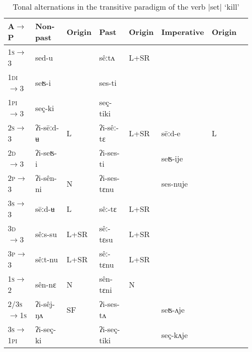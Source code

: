 \documentclass[oldfontcommands,oneside,a4paper,11pt]{article}
\newcommand{\ipa}[1]{{\phon \mbox{#1}}} %
\begin{document}
\begin{table}[H]
\caption{Tonal alternations in the transitive paradigm of the verb |set| `kill' } \label{tab:trans.paradigm2} \centering
\begin{tabular}{llllllll}
\toprule
A$\rightarrow$P& Non-past & Origin & Past & Origin& Imperative& Origin\\
\midrule
\textsc{1s}$\rightarrow$3 & \ipa{sed-u} & & \ipa{sêːtʌ} &L+SR  &  \\
\textsc{1di}$\rightarrow$3 & \ipa{seʦ-i} &  & \ipa{ses-ti}  & \\
\textsc{1pi}$\rightarrow$3 & \ipa{seç-ki} &  & \ipa{seç-tiki} \\
\textsc{2s}$\rightarrow$3 & \ipa{ʔi-sēːd-ʉ} & L  & \ipa{ʔi-sêː-tɛ} &L+SR  &\ipa{sēːd-e} & L\\
\textsc{2d}$\rightarrow$3 & \ipa{ʔi-seʦ-i} & &  \ipa{ʔi-ses-ti} & & \ipa{seʦ-ije} & \\
\textsc{2p}$\rightarrow$3 & \ipa{ʔi-sên-ni} & N & \ipa{ʔi-ses-tɛnu} & &\ipa{ses-nuje} &\\
\textsc{3s}$\rightarrow$3 & \ipa{sēːd-ʉ} & L &\ipa{sêː-tɛ} & L+SR\\
\textsc{3d}$\rightarrow$3 & \ipa{sêːs-su} &L+SR& \ipa{sêː-tɛsu}   & L+SR\\
\textsc{3p}$\rightarrow$3 & \ipa{sêːt-nu} & L+SR& \ipa{sêː-tɛnu} & L+SR\\
\midrule
\textsc{1s}$\rightarrow$2 & \ipa{sên-nɛ} &N& \ipa{sên-tɛni} &N\\
\textsc{2/3s$\rightarrow$1s} & \ipa{ʔi-sêj-ŋʌ} &SF &\ipa{ʔi-ses-tʌ} & &\ipa{seʦ-ʌje}\\
\textsc{3s$\rightarrow$1pi} & \ipa{ʔi-seç-ki} & &\ipa{ʔi-seç-tiki} & &\ipa{seç-kʌje}\\
\bottomrule
\end{tabular}
\end{table}
\end{document}
